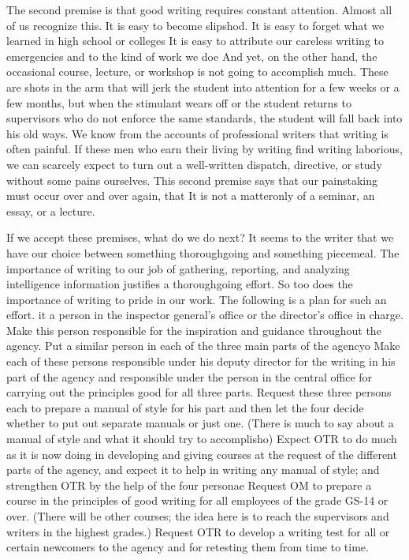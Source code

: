 \documentclass[
    oneside,
    11pt,
    draft
]{memoir}
\begin{document}
The second premise is that good writing requires constant attention. Almost all of us recognize this. It is easy to become slipshod. It is easy to forget what we learned in high school or colleges It is easy to attribute our careless writing to emergencies and to the kind of work we doe And yet, on the other hand, the occasional course, lecture, or workshop is not going to accomplish much. These are shots in the arm that will jerk the student into attention for a few weeks or a few months, but when the stimulant wears off or the student returns to supervisors who do not enforce the same standards, the student will fall back into his old ways. We know from the accounts of professional writers that writing is often painful. If these men who earn their living by writing find writing laborious, we can scarcely expect to turn out a well-written dispatch, directive, or study without some pains ourselves. This second premise says that our painstaking must occur over and over again, that It is not a matteronly of a seminar, an essay, or a lecture. 

If we accept these premises, what do we do next? It seems to the writer that we have our choice between something thoroughgoing and something piecemeal. The importance of writing to our job of gathering, reporting, and analyzing intelligence information justifies a thoroughgoing effort. So too does the importance of writing to pride in our work. The following is a plan for such an effort. it a person in the inspector general's office or the director's office in charge. Make this person responsible for the inspiration and guidance throughout the agency. Put a similar person in each of the three main parts of the agencyo Make each of these persons responsible under his deputy director for the writing in his part of the agency and responsible under the person in the central office for carrying out the principles good for all three parts. Request these three persons each to prepare a manual of style for his part and then let the four decide whether to put out separate manuals or just one. (There is much to say about a manual of style and what it should try to accomplisho) Expect OTR to do much as it is now doing in developing and giving courses at the request of the different parts of the agency, and expect it to help in writing any manual of style; and strengthen OTR by the help of the four personae Request OM to prepare a course in the principles of good writing for all employees of the grade GS-14 or over. (There will be other courses; the idea here is to reach the supervisors and writers in the highest grades.) Request OTR to develop a writing test for all or certain newcomers to the agency and for retesting them from time to time. 
\end{document}

